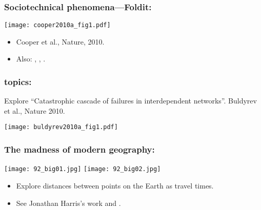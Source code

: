 \begin{frame}
  \frametitle{Sociotechnical phenomena---Foldit:}

  \begin{block}{}
  \texttt{[image: cooper2010a\_fig1.pdf]}
  \begin{itemize}
  \item 
    Cooper et al., Nature, 2010.\cite{cooper2010a}
  \item<2-> 
    Also: , 
    ,
    .
  \end{itemize}
  \end{block}

\end{frame}


\begin{frame}
  \frametitle{topics:}

  \begin{block}{}
  Explore ``Catastrophic cascade of failures in interdependent networks''\cite{buldyrev2010a}.
  Buldyrev et al., Nature 2010.

  \texttt{[image: buldyrev2010a\_fig1.pdf]}
  \end{block}

\end{frame}


\begin{frame}
  \frametitle{The madness of modern geography:}

  \begin{block}{}
    \texttt{[image: 92\_big01.jpg]}
    \texttt{[image: 92\_big02.jpg]}
    \begin{itemize}
    \item
      Explore distances between points on the Earth 
      as travel times.
    \item
      See Jonathan Harris's work 
      and
      .
    \end{itemize}
  \end{block}

\end{frame}


